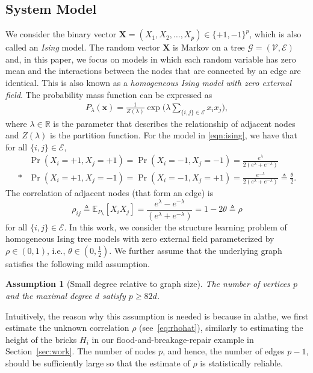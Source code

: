 \documentclass[11pt,onecolumn]{article}
\newcommand{\calE}{\mathcal{E}}
\newcommand{\calG}{\mathcal{G}}
\newcommand{\calV}{\mathcal{V}}
\newcommand{\bx}{\mathbf{x}}
\newcommand{\bX}{\mathbf{X}}
\newcommand{\bbE}{\mathbb{E}}
\newcommand{\bbR}{\mathbb{R}}
\newtheorem{assumption}{Assumption}
\begin{document}
\subsection{System Model}
We consider the binary vector $\bX=(X_{1},X_2,\ldots, X_p)\in\{+1,-1\}^p$, which is also called an \emph{Ising} model. The random vector $\bX$ is Markov on a tree $\calG=(\calV,\calE)$ and, in this paper, we focus on models in which each random variable has zero mean and the interactions between the nodes that are connected by an edge are   identical. This is also known as a {\em homogeneous Ising model   with zero external field}\cite{daskalakis2019testing,tandon2021sga}. The probability mass function can be expressed as
\begin{align}
	P_\lambda(\bx)=\frac{1}{Z(\lambda)}\exp\bigg(\lambda\sum_{ \{i,j\}\in\calE} x_{i}x_{j}\bigg), \label{eqn:ising}
\end{align}
where $\lambda\in\bbR$ is the parameter that describes the relationship  of adjacent nodes and $Z(\lambda)$ is the partition function. For the model in \eqref{eqn:ising}, we have that for all $\{i,j\}\in\calE$, 
\begin{align}
	&\Pr(X_{i}=+1,X_{j}=+1)=\Pr(X_{i}=-1,X_{j}=-1)=\frac{e^{\lambda}}{2(e^{\lambda}+e^{-\lambda})}\nonumber\\*
	&\Pr(X_{i}=+1,X_{j}=-1)=\Pr(X_{i}=-1,X_{j}=+1)=\frac{e^{-\lambda}}{2(e^{\lambda}+e^{-\lambda})}\triangleq\frac{\theta}{2}.
\end{align}
The correlation of adjacent nodes  (that form an edge)
is
\begin{equation}
\rho_{ij}\triangleq\bbE_{P_\lambda}[X_{i}X_{j}]=\frac{e^{\lambda}-e^{-\lambda}}{(e^{\lambda}+e^{-\lambda})}=1-2\theta\triangleq\rho    
\end{equation}
 for all $\{i,j\}\in\calE$. In this work, we consider the structure learning problem of homogeneous Ising tree models with zero external field parameterized by $\rho\in(0,1)$, i.e., $\theta\in(0,\frac{1}{2})$. We further assume that the underlying graph satisfies the 
following mild assumption.
\begin{assumption}[Small degree relative to graph size]\label{assump:smalldeg}
	The number of vertices $p$ and the maximal degree $d$ satisfy $p\geq 82d$.
\end{assumption}
Intuitively, the reason why this assumption is needed is because in \ac{alathe}, we first estimate the unknown correlation $\rho$ (see~\eqref{eq:rhohat}), similarly to estimating the height of the bricks  $H_i$ in  our  flood-and-breakage-repair example in Section~\ref{sec:work}. The number of nodes $p$, and hence, the number of edges $p-1$, should be sufficiently large so that the estimate of $\rho$  is statistically reliable.
\end{document}
